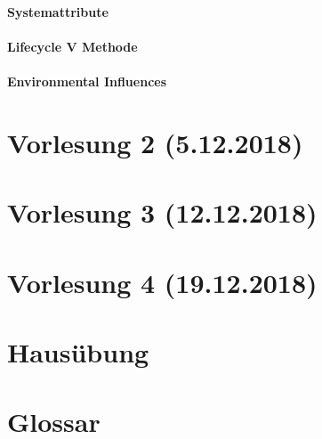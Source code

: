 \documentclass[a4paper,12pt,twoside]{scrreprt}
\begin{document}
      \subsubsection{Systemattribute}
      \subsubsection{Lifecycle V Methode}
      \subsubsection{Environmental Influences}

\chapter{Vorlesung 2 (5.12.2018)}

\chapter{Vorlesung 3 (12.12.2018)}

\chapter{Vorlesung 4 (19.12.2018)}

\chapter{Hausübung}

\clearpage
{}
{}  %
\chapter*{Glossar} %
\begin{acronym}
\end{acronym}
\end{document}
